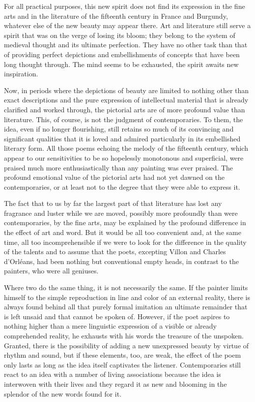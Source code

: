 For all practical purposes, this new spirit does not find its expression
in the fine arts and in the literature of the fifteenth century in
France and Burgundy, whatever else of the new beauty may appear there.
Art and literature still serve a spirit that was on the verge of losing
its bloom; they belong to the system of medieval thought and its
ultimate perfection. They have no other task than that of providing
perfect depictions and embellishments of concepts that have been long
thought through. The mind seems to be exhausted, the spirit awaits new
inspiration.

Now, in periods where the depictions of beauty are limited to nothing
other than exact descriptions and the pure expression of intellectual
material that is already clarified and worked through, the pictorial
arts are of more profound value than literature. This, of course, is not
the judgment of contemporaries. To them, the idea, even if no longer
flourishing, still retains so much of its convincing and significant
qualities that it is loved and admired particularly in its embellished
literary form. All those poems echoing the melody of the fifteenth
century, which appear to our sensitivities to be so hopelessly
monotonous and superficial, were praised much more enthusiastically than
any painting was ever praised. The profound emotional value of the
pictorial arts had not yet dawned on the contemporaries, or at least not
to the degree that they were able to express it.

The fact that to us by far the largest part of that literature has lost
any fragrance and luster while we are moved, possibly more profoundly
than were contemporaries, by the fine arts, may be explained by the
profound difference in the effect of art and word. But it would be all
too convenient and, at the same time, all too incomprehensible if we
were to look for the difference in the quality of the talents and to
assume that the poets, excepting Villon and Charles d'Orléans, had been
nothing but conventional empty heads, in contrast to the painters, who
were all geniuses.

Where two do the same thing, it is not necessarily the same. If the
painter limits himself to the simple reproduction in line and color of
an external reality, there is always found behind all that purely formal
imitation an ultimate remainder that is left unsaid and that cannot be
spoken of. However, if the poet aspires to
noth\protect\hypertarget{21_Chapter_Thirteen__IMAGE_AND_WORD.xhtmlux5cux23page_331}{}{}ing
higher than a mere linguistic expression of a visible or already
comprehended reality, he exhausts with his words the treasure of the
unspoken. Granted, there is the possibility of adding a new unexpressed
beauty by virtue of rhythm and sound, but if these elements, too, are
weak, the effect of the poem only lasts as long as the idea itself
captivates the listener. Contemporaries still react to an idea with a
number of living associations because the idea is interwoven with their
lives and they regard it as new and blooming in the splendor of the new
words found for it.

